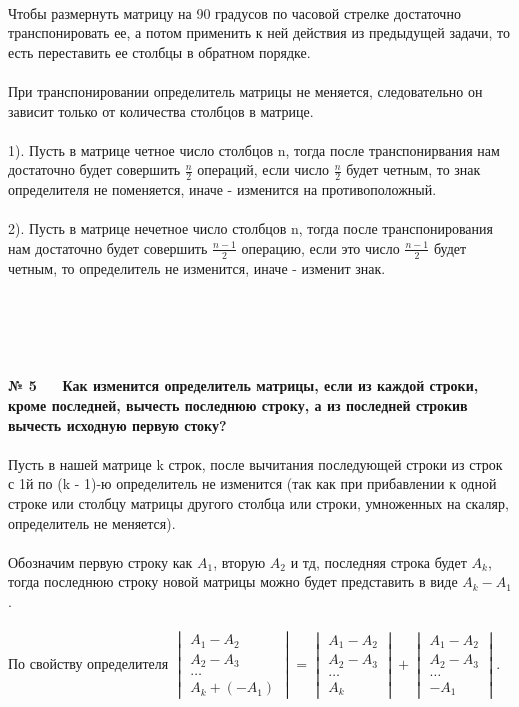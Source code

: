 \documentclass[a4paper, 12pt]{article}
\begin{document}
    \\ Чтобы размернуть матрицу на 90 градусов по часовой стрелке достаточно транспонировать ее, а потом применить к ней действия из предыдущей задачи, то есть переставить ее столбцы в обратном порядке.
    \\
    \\ При транспонировании определитель матрицы не меняется, следовательно он зависит только от количества столбцов в матрице.
    \\
    \\ 1). Пусть в матрице четное число столбцов n, тогда после транспонирвания нам достаточно будет совершить $\frac{n}{2}$ операций, если число $\frac{n}{2}$ будет четным, то знак определителя не поменяется, иначе - изменится на противоположный.
    \\
    \\ 2). Пусть в матрице нечетное число столбцов n, тогда после транспонирования нам достаточно будет совершить $\frac{n - 1}{2}$ операцию, если это число $\frac{n - 1}{2}$ будет четным, то определитель не изменится, иначе - изменит знак.
    \\
    \\
    \\
    \\
    \\
    \\ \textbf{№ 5} \ \ \ \textbf{Как изменится определитель матрицы, если из каждой строки, кроме последней, вычесть последнюю строку, а из последней строкив вычесть исходную первую стоку?}
    \\
    \\ Пусть в нашей матрице k строк, после вычитания последующей строки из строк с 1й по (k - 1)-ю определитель не изменится (так как при прибавлении к одной строке или столбцу матрицы другого столбца или строки, умноженных на скаляр, определитель не меняется).
    \\
    \\ Обозначим первую строку как $A_1$, вторую $A_2$ и тд, последняя строка будет $A_k$, тогда последнюю строку новой матрицы можно будет представить в виде $A_k - A_1$.
    \\
    \\ По свойству определителя $\begin{vmatrix}A_1 - A_2 \\ A_2 - A_3 \\ \dots \\ A_k + (-A_1)\end{vmatrix} = \begin{vmatrix}A_1 - A_2 \\ A_2 - A_3 \\ \dots \\ A_k\end{vmatrix} + \begin{vmatrix}A_1 - A_2 \\ A_2 - A_3 \\ \dots \\ -A_1\end{vmatrix}$. 
\end{document}

